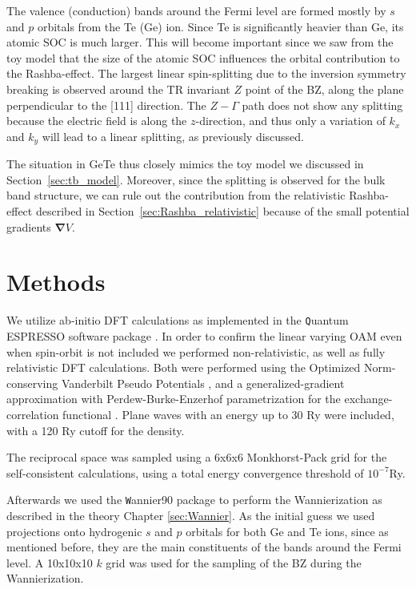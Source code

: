 The valence (conduction) bands around the Fermi level are formed mostly by $s$ and $p$ orbitals from the Te (Ge) ion.
Since Te is significantly heavier than Ge, its atomic SOC is much larger. This will become important since we saw from the toy model that the size of the atomic SOC influences the orbital contribution to the Rashba-effect. 
The largest linear spin-splitting due to the inversion symmetry breaking is observed around the TR invariant $Z$ point of the BZ, along the plane perpendicular to the [111] direction.
The $Z-\Gamma$ path does not show any splitting because the electric field is along the $z$-direction, and thus only a variation of $k_x$ and $k_y$ will lead to a linear splitting, as previously discussed.

The situation in GeTe thus closely mimics the toy model we discussed in Section~\ref{sec:tb_model}.
Moreover, since the splitting is observed for the bulk band structure, we can rule out the contribution from the relativistic Rashba-effect described in Section~\ref{sec:Rashba_relativistic} because of the small potential gradients $\bm{\nabla}V$.

\section{Methods}
We utilize ab-initio DFT calculations as implemented in the {\texttt Quantum ESPRESSO} software package \cite{Giannozzi2009}.
In order to confirm the linear varying OAM even when spin-orbit is not included we performed non-relativistic, as well as fully relativistic DFT calculations.
Both were performed using the Optimized Norm-conserving Vanderbilt Pseudo Potentials \cite{Hamann2013}, and a generalized-gradient approximation \cite{Perdew1993} with Perdew-Burke-Enzerhof parametrization for the exchange-correlation functional \cite{Perdew1996}.
Plane waves with an energy up to 30 Ry were included, with a 120 Ry cutoff for the density.

The reciprocal space was sampled using a 6x6x6 Monkhorst-Pack grid \cite{Pack1977} for the self-consistent calculations, using a total energy convergence threshold of $10^{-7}$Ry.

Afterwards we used the {\texttt Wannier90} package \cite{Mostofi2014AnFunctions} to perform the Wannierization as described in the theory Chapter \ref{sec:Wannier}.
As the initial guess we used projections onto hydrogenic $s$ and $p$ orbitals for both Ge and Te ions, since as mentioned before, they are the main constituents of the bands around the Fermi level.
A 10x10x10 $k$ grid was used for the sampling of the BZ during the Wannierization. 

